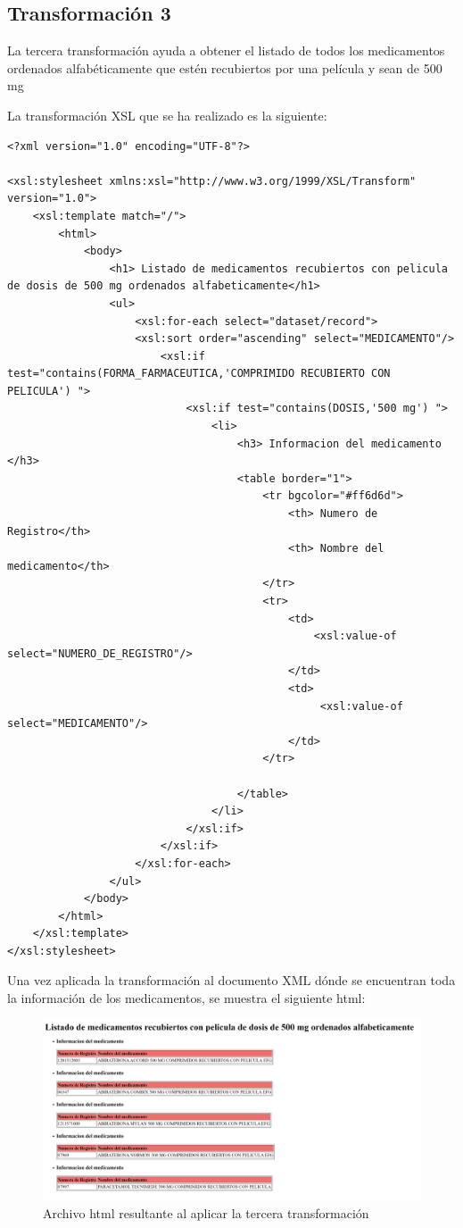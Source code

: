 \documentclass[../main.tex]{subfiles}
\begin{document}
\subsection{Transformación 3}
La tercera transformación ayuda a obtener el listado de todos los medicamentos ordenados alfabéticamente que estén recubiertos por una película y sean de 500 mg

La transformación XSL que se ha realizado es la siguiente:
\begin{lstlisting}
<?xml version="1.0" encoding="UTF-8"?>

<xsl:stylesheet xmlns:xsl="http://www.w3.org/1999/XSL/Transform" version="1.0">
    <xsl:template match="/">
        <html>
            <body>
                <h1> Listado de medicamentos recubiertos con pelicula de dosis de 500 mg ordenados alfabeticamente</h1>
                <ul>
                    <xsl:for-each select="dataset/record">
                    <xsl:sort order="ascending" select="MEDICAMENTO"/>
                        <xsl:if test="contains(FORMA_FARMACEUTICA,'COMPRIMIDO RECUBIERTO CON PELICULA') ">
                            <xsl:if test="contains(DOSIS,'500 mg') ">
                                <li>
                                    <h3> Informacion del medicamento </h3>
                                    <table border="1">
                                        <tr bgcolor="#ff6d6d">
                                            <th> Numero de Registro</th>
                                            <th> Nombre del medicamento</th>
                                        </tr>
                                        <tr>
                                            <td>
                                                <xsl:value-of select="NUMERO_DE_REGISTRO"/>
                                            </td>
                                            <td>
                                                 <xsl:value-of select="MEDICAMENTO"/>
                                            </td>
                                        </tr>

                                    </table>
                                </li>
                            </xsl:if>
                        </xsl:if>
                    </xsl:for-each>
                </ul>
            </body>
        </html>
    </xsl:template>
</xsl:stylesheet>
\end{lstlisting}
Una vez aplicada la transformación al documento XML dónde se encuentran toda la información de los medicamentos, se muestra el siguiente html:

\begin{figure}[h]
    \centering
    \includegraphics[scale=0.2]{images/html_output3.png}
    \caption{Archivo html resultante al aplicar la tercera transformación}
    \label{fig:mesh1}
\end{figure}
\end{document}
